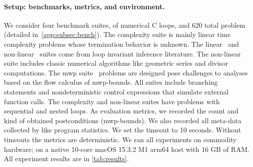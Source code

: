 \paragraph*{Setup: benchmarks, metrics, and environment.}\label{subsec:exp-setup}
We consider four benchmark suites, of numerical C loops, and 620 total problem (detailed in~\autoref{app:subsec:bench}).
The {complexity} suite is mainly linear time complexity problems whose termination behavior is unknown.
The {linear}~\cite{si2018} and {non-linear}~\cite{nguyen2017,yu2023} suites come from loop invariant inference literature.
The non-linear suite includes classic numerical algorithms like geometric series and divisor computations.
The {mwp} suite~\cite{aubert2023b} problems are designed pose challenges to analyses based on the flow calculus of mwp-bounds.
All suites include branching statements and nondeterministic control expressions that simulate external function calls.
The complexity and non-linear suites have problems with sequential and nested loops.
As evaluation metrics, we recorded the count and kind of obtained postconditions (\ie mwp-bounds).
We also recorded all meta-data collected by  like program statistics.
We set the timeout to 10 seconds.
Without timeouts the metrics are deterministic.
We ran all experiments on commodity hardware;
on a native 10-core macOS 15.3.2 M1 arm64 host with 16 GB of RAM\@.
All experiment results are in \autoref{tab:results}.

